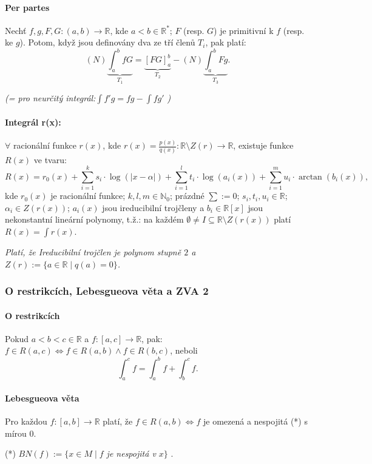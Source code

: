 \documentclass[10pt,a4paper]{article}
\newcommand{\N}{{\mathbb{N}}}
\newcommand{\R}{{\mathbb{R}}}
\begin{document}
\paragraph*{Per partes} Nechť $f,g, F, G: (a,b) \to \R$, kde $a<b \in \R^*$; $F$ (resp. $G$) je primitivní k $f$ (resp. ke $g$). 
Potom, když jsou definovány dva ze tří členů $T_i$, pak platí:
\[
    (N) \underbrace{\int_{a}^{b}f G}_{T_1} = \underbrace{[F G]_a^b}_{T_2} - (N)\underbrace{\int_{a}^{b}Fg}_{T_3}.
\]

\textit{(= pro neurčitý integrál:$\displaystyle \int f' g = fg - \int f g'$ )}

\paragraph*{Integrál r(x):} $\forall$ racionální funkce $r(x)$, kde $r(x) = \frac{p(x)}{q(x)}: \R \setminus Z(r) \to \R$, existuje funkce $R(x)$ ve tvaru:
\[
    R(x) = r_0(x) + \sum_{i=1}^{k}s_i \cdot \log(|x-\alpha|) + \sum_{i=1}^{l}t_i \cdot \log(a_i(x)) + \sum_{i=1}^{m}u_i\cdot \arctan(b_i(x)),
\] 
kde $r_0(x)$ je racionální funkce; $k,l,m \in \N_0$; prázdné $\sum := 0$; $s_i,t_i,u_i\in \R$; 
$\alpha_i\in Z(r(x))$; $a_i(x)$ jsou ireducibilní trojčleny a $b_i\in \R[x]$ jsou nekonstantní lineární polynomy, 
t.ž.: na každém $\emptyset \neq I\subseteq \R\setminus Z(r(x))$ platí $\displaystyle R(x) = \int r(x)$.

\textit{Platí, že Ireducibilní trojčlen je polynom stupně $2$ a $Z(r):= \{a\in \R \mid q(a) = 0\}$.}
\subsubsection{O restrikcích, Lebesgueova věta a ZVA 2}

\paragraph*{O restrikcích} Pokud $a<b<c \in \R$ a $f:[a,c]\to \R$, pak: $f\in R(a,c)\iff f\in R(a,b) \land f\in R(b,c)$, 
neboli $$\int_{a}^{c} f = \int_{a}^{b} f + \int_{b}^{c}f .$$

\paragraph*{Lebesgueova věta} Pro každou $f:[a, b] \to \R$ platí, že $f\in R(a,b)\iff f$ je omezená a nespojitá (*) s mírou $0$.

(*) \textit{$BN(f):= \{x \in M \mid f $ je nespojitá v $x \}$ }.
\end{document}
